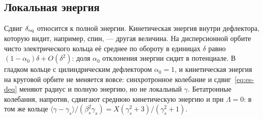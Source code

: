 \subsection{Локальная энергия}

Сдвиг $\delta_{\mathrm{eq}}$ относится к полной энергии. Кинетическая энергия внутри дефлектора, которую видит, например, спин, --- другая величина. На дисперсионной орбите чисто электрического кольца её среднее по обороту в единицах $\delta$ равно $(1-\alpha_0)\delta+O(\delta^2)$: доля $\alpha_0$ отклонения энергии сидит в потенциале. В гладком кольце с цилиндрическим дефлектором $\alpha_0=1$, и кинетическая энергия на круговой орбите не меняется вовсе: синхротронное колебание и сдвиг~\eqref{eq:es-deq} меняют радиус и полную энергию, но не локальный $\gamma$. Бетатронные колебания, напротив, сдвигают среднюю кинетическую энергию и при $\Lambda=0$: в том же кольце $\langle\gamma-\gamma_s\rangle/(\beta_s^2\gamma_s)=X(\gamma_s^2+3)/(\gamma_s^2+1)$.
